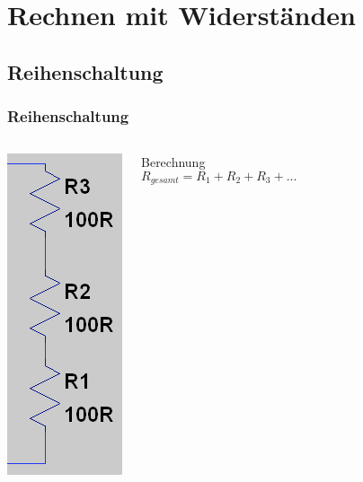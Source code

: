 
\section{Rechnen mit Widerständen}

\subsection{Reihenschaltung}
\begin{frame}
  \frametitle{Reihenschaltung}
        
  \begin{columns}
    \begin{center}
      \includegraphics[width=.4\textwidth]{e04/Reihe.png}\footnotemark
    \end{center}
    \pause
    \begin{block}{Berechnung}
      $$R_{gesamt} = R_1 + R_2 + R_3 + ...$$
    \end{block}
  \end{columns}

\end{frame}

